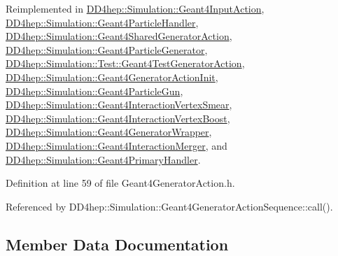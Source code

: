 Reimplemented in \hyperlink{class_d_d4hep_1_1_simulation_1_1_geant4_input_action_abda8423a68e04eec20eb52c01883c0ba}{D\+D4hep\+::\+Simulation\+::\+Geant4\+Input\+Action}, \hyperlink{class_d_d4hep_1_1_simulation_1_1_geant4_particle_handler_a239e9338d41588f5dcfc3ea012aba02a}{D\+D4hep\+::\+Simulation\+::\+Geant4\+Particle\+Handler}, \hyperlink{class_d_d4hep_1_1_simulation_1_1_geant4_shared_generator_action_a21ff9d287af96c7bb0a3cf8975cac070}{D\+D4hep\+::\+Simulation\+::\+Geant4\+Shared\+Generator\+Action}, \hyperlink{class_d_d4hep_1_1_simulation_1_1_geant4_particle_generator_a4b7c8fdbc6fdc0c79efdf112c8ede315}{D\+D4hep\+::\+Simulation\+::\+Geant4\+Particle\+Generator}, \hyperlink{class_d_d4hep_1_1_simulation_1_1_test_1_1_geant4_test_generator_action_af50b716c4764ffa0bf42c4b01ee3d394}{D\+D4hep\+::\+Simulation\+::\+Test\+::\+Geant4\+Test\+Generator\+Action}, \hyperlink{class_d_d4hep_1_1_simulation_1_1_geant4_generator_action_init_adbcf087dfc4c0ac510b102dfd1f838b0}{D\+D4hep\+::\+Simulation\+::\+Geant4\+Generator\+Action\+Init}, \hyperlink{class_d_d4hep_1_1_simulation_1_1_geant4_particle_gun_a4e68905424d21f2386d24d3cbaf795f1}{D\+D4hep\+::\+Simulation\+::\+Geant4\+Particle\+Gun}, \hyperlink{class_d_d4hep_1_1_simulation_1_1_geant4_interaction_vertex_smear_ada2914ca2a761ff0e1ccbbcc8bef578e}{D\+D4hep\+::\+Simulation\+::\+Geant4\+Interaction\+Vertex\+Smear}, \hyperlink{class_d_d4hep_1_1_simulation_1_1_geant4_interaction_vertex_boost_ab66ab43b06523e720a1e377ecd065a66}{D\+D4hep\+::\+Simulation\+::\+Geant4\+Interaction\+Vertex\+Boost}, \hyperlink{class_d_d4hep_1_1_simulation_1_1_geant4_generator_wrapper_a073ee3177fe624c0caf2bb5068d9d865}{D\+D4hep\+::\+Simulation\+::\+Geant4\+Generator\+Wrapper}, \hyperlink{class_d_d4hep_1_1_simulation_1_1_geant4_interaction_merger_a5af2cee708859468f78130560ffa4a6e}{D\+D4hep\+::\+Simulation\+::\+Geant4\+Interaction\+Merger}, and \hyperlink{class_d_d4hep_1_1_simulation_1_1_geant4_primary_handler_a54370e4749de14a101a248981f51864b}{D\+D4hep\+::\+Simulation\+::\+Geant4\+Primary\+Handler}.



Definition at line 59 of file Geant4\+Generator\+Action.\+h.



Referenced by D\+D4hep\+::\+Simulation\+::\+Geant4\+Generator\+Action\+Sequence\+::call().



\subsection{Member Data Documentation}
\hypertarget{class_d_d4hep_1_1_simulation_1_1_geant4_generator_action_aa0b8787cbdd5dfefc992aac6dd1073c3}{}\label{class_d_d4hep_1_1_simulation_1_1_geant4_generator_action_aa0b8787cbdd5dfefc992aac6dd1073c3} 
